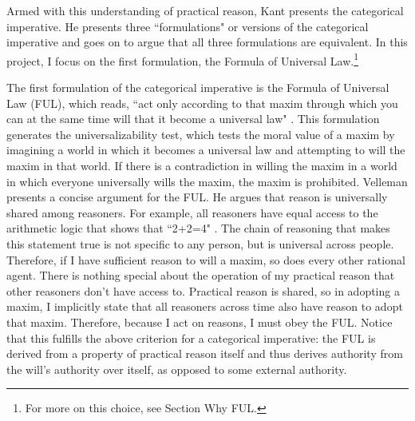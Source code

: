 \begin{isabellebody}
\begin{isamarkuptext}
Armed with this understanding of practical reason, Kant presents the categorical 
imperative. He presents three ``formulations" or versions of the categorical imperative and goes on to 
argue that all three formulations are equivalent. In this project, I focus on the first formulation,
the Formula of Universal Law.\footnote{For more on this 
choice, see Section Why FUL.}

The first formulation of the categorical imperative is the
Formula of Universal Law (FUL), which reads, ``act only according to that maxim through which you can 
at the same time will that it become a universal law" \cite[34]{groundwork}. This formulation
generates the universalizability test, which tests the moral value of a maxim by 
imagining a world in which it becomes a universal law and attempting to will the maxim in that world.
If there is a contradiction in willing the maxim in a world in which everyone universally wills the maxim,
the maxim is prohibited. 
Velleman presents a concise argument for the FUL. He argues that reason is universally shared among reasoners. For 
example, all reasoners have equal access to the arithmetic logic that shows that ``2+2=4" \cite[29]{velleman}. The chain of 
reasoning that makes this statement true is not specific to any person, but is universal across people. 
Therefore, if I have sufficient reason to will a maxim, so does every other rational agent. There is 
nothing special about the operation of my practical reason that other reasoners don't have access to. 
Practical reason is shared, so in adopting a maxim, I implicitly state that all reasoners
across time also have reason to adopt that maxim. Therefore, because I act on reasons, I must obey the 
FUL. Notice that this fulfills the above criterion for a categorical imperative: the FUL is derived from 
a property of practical reason itself and thus derives authority from the will's authority over itself, 
as opposed to some external authority.


\end{isamarkuptext}
\end{isabellebody}

